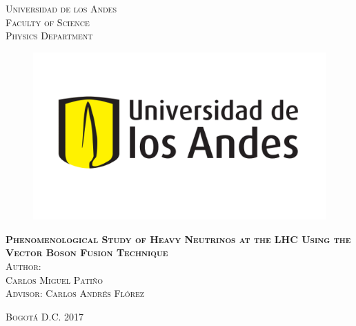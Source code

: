\documentclass[11pt, oneside]{book}
\begin{document}
\begin{titlepage}
\begin{center}

\textsc{\Large Universidad de los Andes}\\[3em]

\textsc{\large Faculty of Science}\\[1em]

\textsc{\large Physics Department} \\[1em]

\begin{figure}[H]
\begin{center}
\includegraphics[scale = 0.4]{logo-uniandes.png}
\end{center}
\end{figure}

\vspace{0.5em}

\textsc{\huge \textbf{Phenomenological Study of Heavy Neutrinos at the LHC Using the Vector Boson Fusion Technique}}\\[4em]





\textsc{Author:}\\[1em]

\textsc{\Large Carlos Miguel Patiño}\\[1em]

\textsc{\large Advisor: Carlos Andrés Flórez}

\end{center}

\vspace*{\fill}
\textsc{Bogotá D.C. \hspace*{\fill} 2017}

\end{titlepage}
\end{document}
